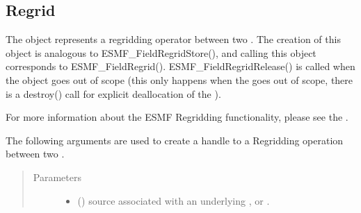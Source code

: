 \documentclass[letterpaper,10pt,english]{sphinxmanual}
\begin{document}
\subsection{Regrid}
\label{\detokenize{regrid:regrid}}\label{\detokenize{regrid::doc}}

\begin{fulllineitems}
\label{\detokenize{regrid:ESMF.api.regrid.Regrid}}
The {\hyperref[\detokenize{regrid:ESMF.api.regrid.Regrid}]{}} object represents a regridding operator between two {\hyperref[\detokenize{field:ESMF.api.field.Field}]{}}.  The
creation of this object is analogous to ESMF\_FieldRegridStore(), and
calling this object corresponds to ESMF\_FieldRegrid().
ESMF\_FieldRegridRelease() is called when the {\hyperref[\detokenize{regrid:ESMF.api.regrid.Regrid}]{}} object goes out of
scope (this only happens when the {\hyperref[\detokenize{manager:ESMF.api.esmpymanager.Manager}]{}} goes out of scope, there is a
destroy() call for explicit deallocation of the {\hyperref[\detokenize{regrid:ESMF.api.regrid.Regrid}]{}}).

For more information about the ESMF Regridding functionality, please see
the .

The following arguments are used to create a handle to a Regridding
operation between two {\hyperref[\detokenize{field:ESMF.api.field.Field}]{}}.

\begin{quote}\begin{description}
\item[{Parameters}] \leavevmode\begin{itemize}
\item {} 
 ({\hyperref[\detokenize{field:ESMF.api.field.Field}]{}}) \textendash{} source {\hyperref[\detokenize{field:ESMF.api.field.Field}]{}} associated with an underlying {\hyperref[\detokenize{grid:ESMF.api.grid.Grid}]{}},
{\hyperref[\detokenize{mesh:ESMF.api.mesh.Mesh}]{}} or {\hyperref[\detokenize{locstream:ESMF.api.locstream.LocStream}]{}}.


\end{itemize}
\end{description}
\end{quote}
\end{fulllineitems}
\end{document}
